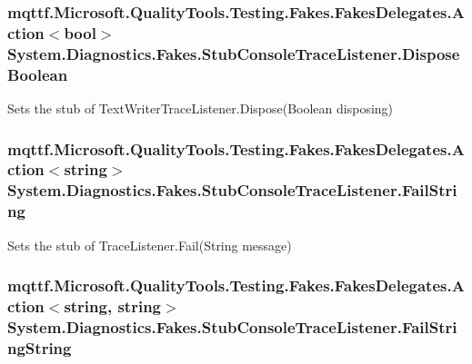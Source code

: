 \hypertarget{class_system_1_1_diagnostics_1_1_fakes_1_1_stub_console_trace_listener_aa6155bc4322e877d539f82088349e966}{
\subsubsection[{Dispose\-Boolean}]{\setlength{\rightskip}{0pt plus 5cm}mqttf.\-Microsoft.\-Quality\-Tools.\-Testing.\-Fakes.\-Fakes\-Delegates.\-Action$<$bool$>$ System.\-Diagnostics.\-Fakes.\-Stub\-Console\-Trace\-Listener.\-Dispose\-Boolean}}\label{class_system_1_1_diagnostics_1_1_fakes_1_1_stub_console_trace_listener_aa6155bc4322e877d539f82088349e966}


Sets the stub of Text\-Writer\-Trace\-Listener.\-Dispose(\-Boolean disposing)

\hypertarget{class_system_1_1_diagnostics_1_1_fakes_1_1_stub_console_trace_listener_ad0e0632b11b0b94aaabc0147343fe1a4}{
\subsubsection[{Fail\-String}]{\setlength{\rightskip}{0pt plus 5cm}mqttf.\-Microsoft.\-Quality\-Tools.\-Testing.\-Fakes.\-Fakes\-Delegates.\-Action$<$string$>$ System.\-Diagnostics.\-Fakes.\-Stub\-Console\-Trace\-Listener.\-Fail\-String}}\label{class_system_1_1_diagnostics_1_1_fakes_1_1_stub_console_trace_listener_ad0e0632b11b0b94aaabc0147343fe1a4}


Sets the stub of Trace\-Listener.\-Fail(\-String message)

\hypertarget{class_system_1_1_diagnostics_1_1_fakes_1_1_stub_console_trace_listener_a0e6e35037854a73baf8b3e09fa4912df}{
\subsubsection[{Fail\-String\-String}]{\setlength{\rightskip}{0pt plus 5cm}mqttf.\-Microsoft.\-Quality\-Tools.\-Testing.\-Fakes.\-Fakes\-Delegates.\-Action$<$string, string$>$ System.\-Diagnostics.\-Fakes.\-Stub\-Console\-Trace\-Listener.\-Fail\-String\-String}}\label{class_system_1_1_diagnostics_1_1_fakes_1_1_stub_console_trace_listener_a0e6e35037854a73baf8b3e09fa4912df}


